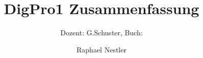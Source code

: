 \documentclass{scrartcl}
\title{DigPro1 Zusammenfassung}
\subtitle{Dozent: G.Schuster, Buch: } %
\author{Raphael Nestler}
\begin{document}
\begin{titlepage}
	\maketitle
	\thispagestyle{empty}
\end{titlepage}
\newpage

\tableofcontents
\newpage






\end{document}
